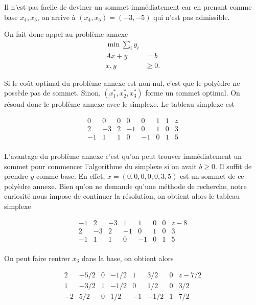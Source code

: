 \begin{enumerate}
\begin{solution}
      Il n'est pas facile de deviner un sommet immédiatement car en
      prenant comme base $x_4,x_5$, on arrive à $(x_4,x_5)=(-3,-5)$
      qui n'est pas admissible.

      On fait donc appel au problème annexe
      \begin{align*}
        \min \sum_i y_i\\
        Ax + y & = b\\
        x,y & \geq 0.
      \end{align*}

      Si le coût optimal du problème annexe est non-nul,
      c'est que le polyèdre ne possède pas de sommet.
      Sinon, $(x_1^*, x_2^*, x_3^*)$ forme un sommet optimal.
      On résoud donc le problème annexe avec le simplexe.
      Le tableau simplexe est

      \[
        \begin{array}{ccccccc|l}
           0 &  0 & 0 &  0 &  0 & 1 & 1 & z\\
          \hline
           2 & -3 & 2 & -1 &  0 & 1 & 0 & 3\\
          -1 &  1 & 1 &  0 & -1 & 0 & 1 & 5\\
        \end{array}
      \]

      L'avantage du problème annexe c'est qu'on peut trouver immédiatement
      un sommet pour commencer l'algorithme du simplexe
      si on avait $b \geq 0$.
      Il suffit de prendre $y$ comme base.
      En effet, $x = (0,0,0,0,0,3,5)$ est un sommet de ce polyèdre annexe.
      Bien qu'on ne demande qu'une méthode de recherche,
      notre curiosité nous impose de continuer la résolution,
      on obtient alors le tableau simplexe

      \[
        \begin{array}{ccccccc|l}
          -1 &  2 & -3 &  1 &  1 & 0 & 0 & z-8\\
          \hline
           2 & -3 &  2 & -1 &  0 & 1 & 0 & 3\\
          -1 &  1 &  1 &  0 & -1 & 0 & 1 & 5\\
        \end{array}
      \]

      On peut faire rentrer $x_3$ dans la base,
      on obtient alors

      \[
        \begin{array}{ccccccc|l}
           2 & -5/2 &  0 & -1/2 &  1 &  3/2 & 0 & z-7/2\\
          \hline
           1 & -3/2 &  1 & -1/2 &  0 &  1/2 & 0 & 3/2\\
          -2 &  5/2 &  0 &  1/2 & -1 & -1/2 & 1 & 7/2\\
        \end{array}
      \]


\end{solution}
\end{enumerate}
